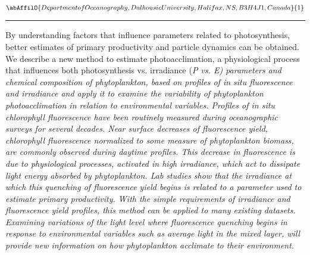\begin{center}
   \vspace{2 mm} \begin{center}
    \vspace{2 mm}\begin{center}
  
  $\abAffilO{Department of Oceanography, Dalhousie University, Halifax, NS, B3H 4J1, Canada}{1}$

  \end{center}
  \vspace{2 mm}
  \end{center}\end{center}
  \begin{center}\rule{0.70\linewidth}{0.5 pt}\end{center}

\noindent By understanding factors that influence parameters related to photosynthesis, better estimates of primary productivity and particle dynamics can be obtained. We describe a new method to estimate photoacclimation, a physiological process that influences both photosynthesis vs. irradiance (\sl P \rm vs. \sl E\rm) parameters and chemical composition of phytoplankton, based on profiles of \sl in situ \rm fluorescence and irradiance and apply it to examine the variability of phytoplankton photoacclimation in relation to environmental variables.
Profiles of \sl in situ \rm chlorophyll fluorescence have been routinely measured during oceanographic surveys for several decades. Near surface decreases of fluorescence yield, chlorophyll fluorescence normalized to some measure of phytoplankton biomass, are commonly observed during daytime profiles. This decrease in fluorescence is due to physiological processes, activated in high irradiance, which act to dissipate light energy absorbed by phytoplankton. Lab studies show that the irradiance at which this quenching of fluorescence yield begins is related to a parameter used to estimate primary productivity. With the simple requirements of irradiance and fluorescence yield profiles, this method can be applied to many existing datasets. Examining variations of the light level where fluorescence quenching begins in response to environmental variables such as average light in the mixed layer, will provide new information on how phytoplankton acclimate to their environment.

